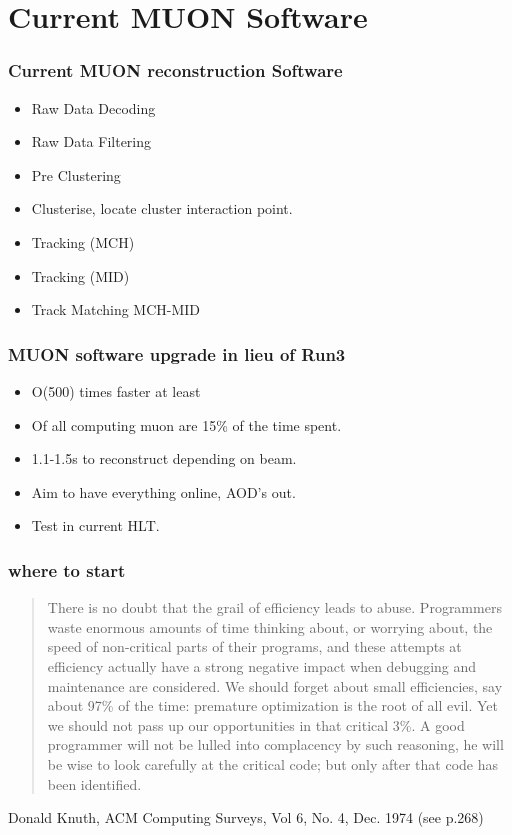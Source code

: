 \documentclass{beamer}
\begin{document}
\section{Current MUON Software}

\begin{frame}
\frametitle{Current MUON reconstruction Software}
\begin{itemize}
  \item Raw Data Decoding
  \item Raw Data Filtering
  \item Pre Clustering 
  \item Clusterise, locate cluster interaction point.
  \item Tracking (MCH)
  \item Tracking (MID)
  \item Track Matching MCH-MID
\end{itemize}
\end{frame}
\begin{frame}
  \frametitle{MUON software upgrade in lieu of Run3}
  \begin{itemize}
    \item O(500) times faster at least
    \item Of all computing muon are 15\% of the time spent.
    \item 1.1-1.5s to reconstruct depending on beam.
    \item Aim to have everything online, AOD's out.
    \item Test in current HLT.
  \end{itemize}
\end{frame}
\begin{frame}
  \frametitle{where to start}
  \begin{quote}
\small{There is no doubt that the grail of efficiency leads to abuse. Programmers waste enormous amounts of time thinking about, or worrying about, the speed of non-critical parts of their programs, and these attempts at efficiency actually have a strong negative impact when debugging and maintenance are considered. We should forget about small efficiencies, say about 97\% of the time: premature optimization is the root of all evil.
Yet we should not pass up our opportunities in that critical 3\%. A good programmer will not be lulled into complacency by such reasoning, he will be wise to look carefully at the critical code; but only after that code has been identified.}  
  \end{quote}
Donald Knuth, ACM Computing Surveys, Vol 6, No. 4, Dec. 1974 (see p.268)
\end{frame}
\end{document}
